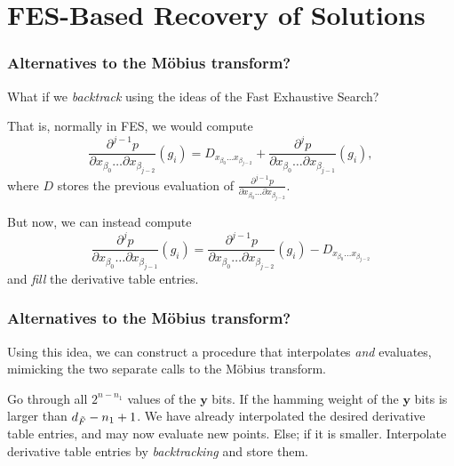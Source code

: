 \documentclass{beamer}
\begin{document}
\section{FES-Based Recovery of Solutions}
\begin{frame}
    \frametitle{Alternatives to the Möbius transform?}

    \pause 

    What if we \textit{backtrack} using the ideas of the Fast Exhaustive Search?

    \pause

    That is, normally in FES, we would compute 
    $$
        \frac{\partial^{j - 1} p}{\partial x_{\beta_0} \dots \partial x_{\beta_{j - 2}}}(g_i) = D_{x_{\beta_0} \dots x_{\beta_{j - 2}}} + \frac{\partial^j p}{\partial x_{\beta_0} \dots \partial x_{\beta_{j - 1}}}(g_i),
    $$
    where $D$ stores the previous evaluation of $\frac{\partial^{j - 1} p}{\partial x_{\beta_0} \dots \partial x_{\beta_{j - 2}}}$.
    
    \pause

    But now, we can instead compute 
    $$
        \frac{\partial^j p}{\partial x_{\beta_0} \dots \partial x_{\beta_{j - 1}}}(g_i) = \frac{\partial^{j - 1} p}{\partial x_{\beta_0} \dots \partial x_{\beta_{j - 2}}}(g_i) - D_{x_{\beta_0} \dots x_{\beta_{j - 2}}}
    $$
    and \textit{fill} the derivative table entries.
\end{frame}

\begin{frame}
    \frametitle{Alternatives to the Möbius transform?}
    Using this idea, we can construct a procedure that interpolates \textit{and} evaluates, mimicking the two separate calls to the Möbius transform.

    \begin{outline}
        \1 Go through all $2^{n - n_1}$ values of the $\mathbf{y}$ bits.
            \2 If the hamming weight of the $\mathbf{y}$ bits is larger than $d_{\Tilde{F}} - n_1 + 1$.
                \3 We have already interpolated the desired derivative table entries, and may now evaluate new points.
            \2 Else; if it is smaller.
                \3 Interpolate derivative table entries by \textit{backtracking} and store them.
    \end{outline}
\end{frame}
\end{document}

